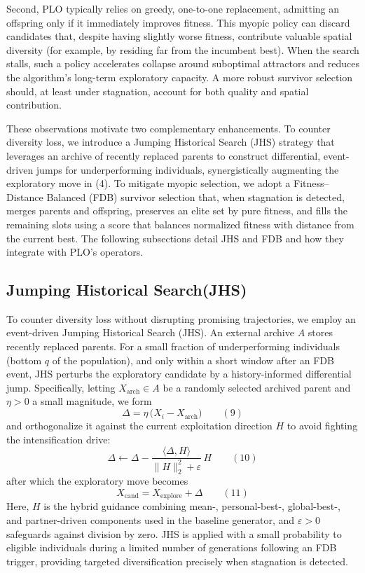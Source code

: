 \documentclass[3p]{elsarticle}
\begin{document}
Second, PLO typically relies on greedy, one-to-one replacement, admitting an offspring only if it immediately improves fitness. This myopic policy can discard candidates that, despite having slightly worse fitness, contribute valuable spatial diversity (for example, by residing far from the incumbent best). When the search stalls, such a policy accelerates collapse around suboptimal attractors and reduces the algorithm's long-term exploratory capacity. A more robust survivor selection should, at least under stagnation, account for both quality and spatial contribution.

These observations motivate two complementary enhancements. To counter diversity loss, we introduce a Jumping Historical Search (JHS) strategy that leverages an archive of recently replaced parents to construct differential, event-driven jumps for underperforming individuals, synergistically augmenting the exploratory move in (4). To mitigate myopic selection, we adopt a Fitness–Distance Balanced (FDB) survivor selection that, when stagnation is detected, merges parents and offspring, preserves an elite set by pure fitness, and fills the remaining slots using a score that balances normalized fitness with distance from the current best. The following subsections detail JHS and FDB and how they integrate with PLO's operators.

\subsection{Jumping Historical Search(JHS)}
To counter diversity loss without disrupting promising trajectories, we employ an event-driven Jumping Historical Search (JHS). An external archive \(A\) stores recently replaced parents. For a small fraction of underperforming individuals (bottom \(q\) of the population), and only within a short window after an FDB event, JHS perturbs the exploratory candidate by a history-informed differential jump. Specifically, letting \(X_{\!\text{arch}}\in A\) be a randomly selected archived parent and \(\eta>0\) a small magnitude, we form
\[ \Delta = \eta\,\bigl(X_i - X_{\!\text{arch}}\bigr) \qquad(9) \]
and orthogonalize it against the current exploitation direction \(H\) to avoid fighting the intensification drive:
\[ \Delta \leftarrow \Delta - \frac{\langle \Delta, H \rangle}{\lVert H \rVert_2^2 + \varepsilon}\,H \qquad(10) \]
after which the exploratory move becomes
\[ X_{\mathrm{cand}} = X_{\mathrm{explore}} + \Delta \qquad(11) \]
Here, \(H\) is the hybrid guidance combining mean-, personal-best-, global-best-, and partner-driven components used in the baseline generator, and \(\varepsilon>0\) safeguards against division by zero. JHS is applied with a small probability to eligible individuals during a limited number of generations following an FDB trigger, providing targeted diversification precisely when stagnation is detected.
\end{document}
